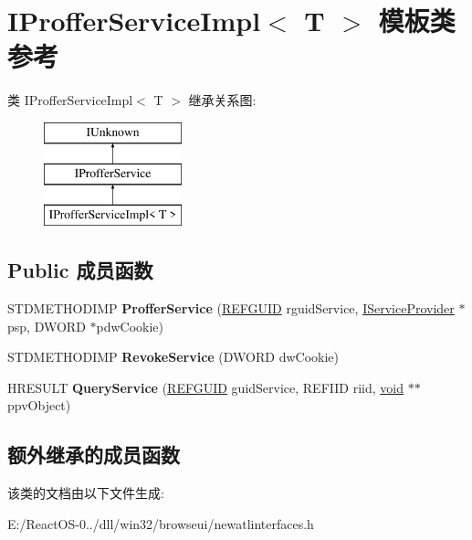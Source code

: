 \hypertarget{class_i_proffer_service_impl}{}\section{I\+Proffer\+Service\+Impl$<$ T $>$ 模板类 参考}
\label{class_i_proffer_service_impl}
类 I\+Proffer\+Service\+Impl$<$ T $>$ 继承关系图\+:\begin{figure}[H]
\begin{center}
\leavevmode
\includegraphics[height=3.000000cm]{class_i_proffer_service_impl}
\end{center}
\end{figure}
\subsection*{Public 成员函数}
\begin{DoxyCompactItemize}
\item 
\mbox{\label{class_i_proffer_service_impl_aa7bcabbb8c788bf30b54b2149d54ae3c}} 
S\+T\+D\+M\+E\+T\+H\+O\+D\+I\+MP {\bfseries Proffer\+Service} (\hyperlink{struct___g_u_i_d}{R\+E\+F\+G\+U\+ID} rguid\+Service, \hyperlink{interface_i_service_provider}{I\+Service\+Provider} $\ast$psp, D\+W\+O\+RD $\ast$pdw\+Cookie)
\item 
\mbox{\label{class_i_proffer_service_impl_a6df2a961c616bc72d0de238e7844562b}} 
S\+T\+D\+M\+E\+T\+H\+O\+D\+I\+MP {\bfseries Revoke\+Service} (D\+W\+O\+RD dw\+Cookie)
\item 
\mbox{\label{class_i_proffer_service_impl_ace3f486bba82ca3e8d59d55bcdbdcb6d}} 
H\+R\+E\+S\+U\+LT {\bfseries Query\+Service} (\hyperlink{struct___g_u_i_d}{R\+E\+F\+G\+U\+ID} guid\+Service, R\+E\+F\+I\+ID riid, \hyperlink{interfacevoid}{void} $\ast$$\ast$ppv\+Object)
\end{DoxyCompactItemize}
\subsection*{额外继承的成员函数}


该类的文档由以下文件生成\+:\begin{DoxyCompactItemize}
\item 
E\+:/\+React\+O\+S-\/0../dll/win32/browseui/newatlinterfaces.\+h\end{DoxyCompactItemize}
